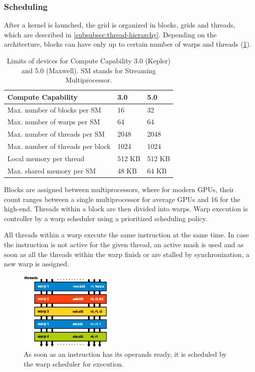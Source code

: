 \FloatBarrier

\subsubsection{Scheduling}\label{subsubsec:scheduling}

After a kernel is launched, the grid is organized in blocks, grids and threads, which are described in \ref{subsubsec:thread-hierarchy}. Depending on the architecture, blocks can have only up to certain number of warps and threads (\ref{tab:capability-3050}).

\begin{table}[htbp]
\begin{center}
\begin{tabularx}{0.75\textwidth}{| X | X | X |}
\hline
Compute Capability & 3.0 & 5.0 \\
\hline
Max. number of blocks per SM & 16 & 32 \\
\hline
Max. number of warps per SM & 64 & 64 \\
\hline
Max. number of threads per SM & 2048 & 2048\\
\hline
Max. number of threads per block & 1024 & 1024\\
\hline
Local memory per thread & 512 KB & 512 KB \\
\hline
Max. shared memory per SM & 48 KB & 64 KB\\
\hline
\end{tabularx}
\end{center}
\caption{Limits of devices for Compute Capability 3.0 (Kepler) and 5.0 (Maxwell). SM stands for Streaming Multiprocessor.}
\label{tab:capability-3050}
\end{table}

Blocks are assigned between multiprocessors, where for modern GPUs, their count ranges between a single multiprocessor for average GPUs and 16 for the high-end. Threads within a block are then divided into warps. Warp execution is controller by a warp scheduler using a prioritized scheduling policy.

All threads within a warp execute the same instruction at the same time. In case the instruction is not active for the given thread, an active mask is used and as soon as all the threads within the warp finish or are stalled by synchronization, a new warp is assigned.

\begin{figure}[h]
	\begin{center}
	\includegraphics[width=0.4\textwidth]{fig/scheduling.eps}
	\caption{As soon as an instruction has its operands ready, it is scheduled by the warp scheduler for execution.}
	\label{fig:scheduling}
	\end{center}
\end{figure}

